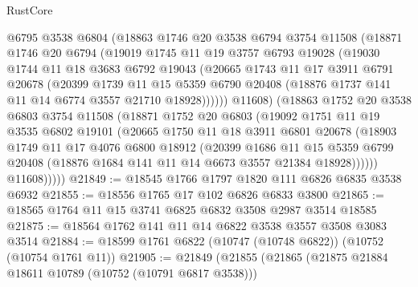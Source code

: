 \begin{lexlean}{RustCore}
\begin{coremodule}
            @6795
            @3538
            @6804
            (@18863
              @1746
              @20
              @3538
              @6794
              @3754
              @11508
              (@18871
                @1746
                @20
                @6794
                (@19019
                  @1745
                  @11
                  @19
                  @3757
                  @6793
                  @19028
                  (@19030
                    @1744
                    @11
                    @18
                    @3683
                    @6792
                    @19043
                    (@20665
                      @1743
                      @11
                      @17
                      @3911
                      @6791
                      @20678
                      (@20399
                        @1739
                        @11
                        @15
                        @5359
                        @6790
                        @20408
                        (@18876 @1737 @141 @11 @14 @6774 @3557 @21710 @18928))))))
              @11608)
            (@18863
              @1752
              @20
              @3538
              @6803
              @3754
              @11508
              (@18871
                @1752
                @20
                @6803
                (@19092
                  @1751
                  @11
                  @19
                  @3535
                  @6802
                  @19101
                  (@20665
                    @1750
                    @11
                    @18
                    @3911
                    @6801
                    @20678
                    (@18903
                      @1749
                      @11
                      @17
                      @4076
                      @6800
                      @18912
                      (@20399
                        @1686
                        @11
                        @15
                        @5359
                        @6799
                        @20408
                        (@18876 @1684 @141 @11 @14 @6673 @3557 @21384 @18928))))))
              @11608)))))
@21849 := @18545 @1766 @1797 @1820 @111 @6826 @6835 @3538 @6932
@21855 := @18556 @1765 @17 @102 @6826 @6833 @3800
@21865 := @18565 @1764 @11 @15 @3741 @6825 @6832 @3508 @2987 @3514 @18585
@21875 := @18564 @1762 @141 @11 @14 @6822 @3538 @3557 @3508 @3083 @3514
@21884 := @18599 @1761 @6822 (@10747 (@10748 @6822)) (@10752 (@10754 @1761 @11))
@21905 := @21849
    (@21855
      (@21865
        (@21875 @21884 @18611 @10789 (@10752 (@10791 @6817 @3538)))

\end{coremodule}
\end{lexlean}
